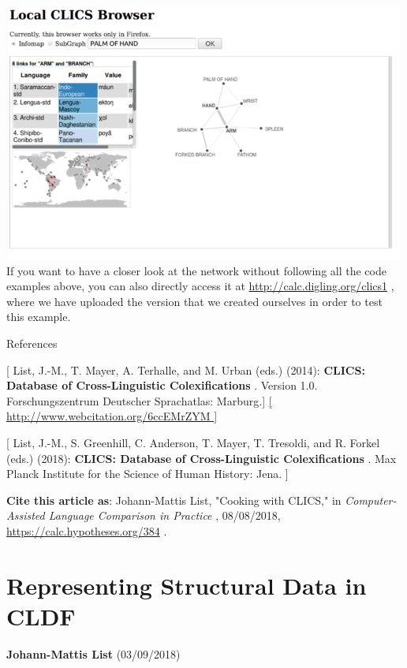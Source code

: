 \documentclass[
  english,
  a4paper,
  oneside,tablecaptionabove
]{scrbook}
\begin{document}
\href{http://calc.digling.org/clics1/graph.html?infomap_42_HAND}{\includegraphics[width=5.20833in,height=3.34375in]{images/__calc.hypotheses.org_files_2018_08_local-clics-500x321.png}}
If you want to have a closer look at the network without following all
the code examples above, you can also directly access it at
\url{http://calc.digling.org/clics1} , where we have uploaded the
version that we created ourselves in order to test this example.

\leavevmode\hypertarget{markdown}{}%
References

{[} List, J.-M., T. Mayer, A. Terhalle, and M. Urban (eds.) (2014):
\textbf{CLICS: Database of Cross-Linguistic Colexifications} . Version
1.0. Forschungszentrum Deutscher Sprachatlas: Marburg.{]}
\href{//www.webcitation.org/6ccEMrZYM”}{{[}
http://www.webcitation.org/6ccEMrZYM {]}}

{[} List, J.-M., S. Greenhill, C. Anderson, T. Mayer, T. Tresoldi, and
R. Forkel (eds.) (2018): \textbf{CLICS: Database of Cross-Linguistic
Colexifications} . Max Planck Institute for the Science of Human
History: Jena. {]}

\textbf{Cite this article as}: Johann-Mattis List, "Cooking with CLICS,"
in \emph{Computer-Assisted Language Comparison in Practice} ,
08/08/2018, \url{https://calc.hypotheses.org/384} .

\hypertarget{representing-structural-data-in-cldf}{%
\chapter{Representing Structural Data in
CLDF}\label{representing-structural-data-in-cldf}}

\textbf{Johann-Mattis List} (03/09/2018)
\end{document}
